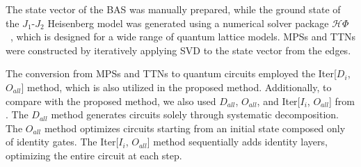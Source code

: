 \documentclass[12pt,dvipdfmx,twoside,openright]{report}
\begin{document}
The state vector of the BAS was manually prepared, while the ground state of the $J_1$-$J_2$ Heisenberg model was generated using a numerical solver package $\mathcal{H}\Phi$~\cite{hphi}, which is designed for a wide range of quantum lattice models. 
MPSs and TTNs were constructed by iteratively applying SVD to the state vector from the edges.

The conversion from MPSs and TTNs to quantum circuits employed the Iter[$D_i$, $O_{all}$] method, which is also utilized in the proposed method.
Additionally, to compare with the proposed method, we also used $D_{all}$, $O_{all}$, and Iter[$I_i$, $O_{all}$] from \cite{mpsdecomp}.
The $D_{all}$ method generates circuits solely through systematic decomposition.
The $O_{all}$ method optimizes circuits starting from an initial state composed only of identity gates.
The Iter[$I_i$, $O_{all}$] method sequentially adds identity layers, optimizing the entire circuit at each step.
\end{document}
